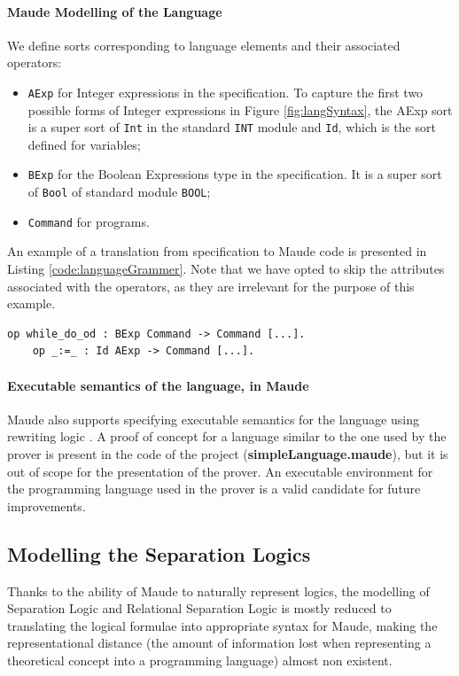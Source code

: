 \documentclass[12pt,a4paper]{article}
\begin{document}
{	\paragraph{Maude Modelling of the Language}
	We define sorts corresponding to language elements and their associated operators:
	\begin{itemize}
		\item \texttt{AExp} for Integer expressions in the specification. To capture the first two possible forms of Integer expressions in Figure \ref{fig:langSyntax}, the AExp sort is a super sort of \texttt{Int} in the standard \texttt{INT} module and \texttt{Id}, which is the sort defined for variables;
		\item \texttt{BExp} for the Boolean Expressions type in the specification. It is a super sort of \texttt{Bool} of standard module \texttt{BOOL}; 
		\item \texttt{Command} for programs.
	\end{itemize}
	An example of a translation from specification to Maude code is presented in Listing \ref{code:languageGrammer}. Note that we have opted to skip the attributes associated with the operators, as they are irrelevant for the purpose of this example.
	\\
	
	\begin{lstlisting}[label=code:languageGrammer,caption=Example of operator translation to Maude code]
	op while_do_od : BExp Command -> Command [...].
	op _:=_ : Id AExp -> Command [...]. 
	\end{lstlisting}
	
	\paragraph{Executable semantics of the language, in Maude}
	Maude also supports specifying executable semantics for the language using rewriting logic \cite{rewrConcurrency}. A proof of concept for a language similar to the one used by the prover is present in the code of the project (\textbf{simpleLanguage.maude}), but it is out of scope for the presentation of the prover. An executable environment for the programming language used in the prover is a valid candidate for future improvements.

 
\subsection{Modelling the Separation Logics}
Thanks to the ability of Maude to naturally represent logics, the modelling of Separation Logic and Relational Separation Logic is mostly reduced to translating the logical formulae into appropriate syntax for Maude, making the representational distance (the amount of information lost when representing a theoretical concept into a programming language) \cite{manual} almost non existent. \\

}
\end{document}
